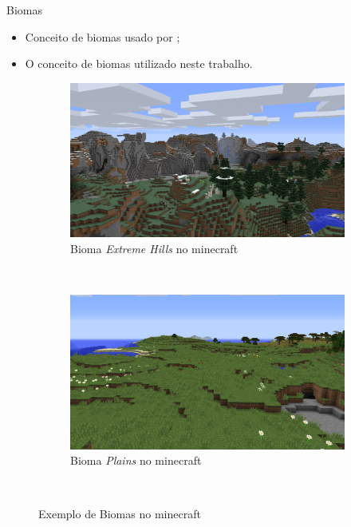 \begin{frame}{Biomas}
    \begin{itemize} \setlength\itemsep{1em}
        \item Conceito de biomas usado por \cite{walter1986vegetaccao};
        \item O conceito de biomas utilizado neste trabalho.
    \end{itemize}
    \begin{figure}
        \centering
        \begin{subfigure}[b]{0.47\textwidth}
            \includegraphics[width=\textwidth]{img/mineExtremeHills}
            \caption{Bioma \textit{Extreme Hills} no minecraft}
            \label{fig:mineExtremeHills}
        \end{subfigure}
        ~ %
        \begin{subfigure}[b]{0.47\textwidth}
            \includegraphics[width=\textwidth]{img/minePlains}
            \caption{Bioma \textit{Plains} no minecraft}
            \label{fig:minePlains}
        \end{subfigure}
        ~ %
        \caption{Exemplo de Biomas no minecraft}
        \label{fig:mineBiomes}
    \end{figure}
    
    
\end{frame}